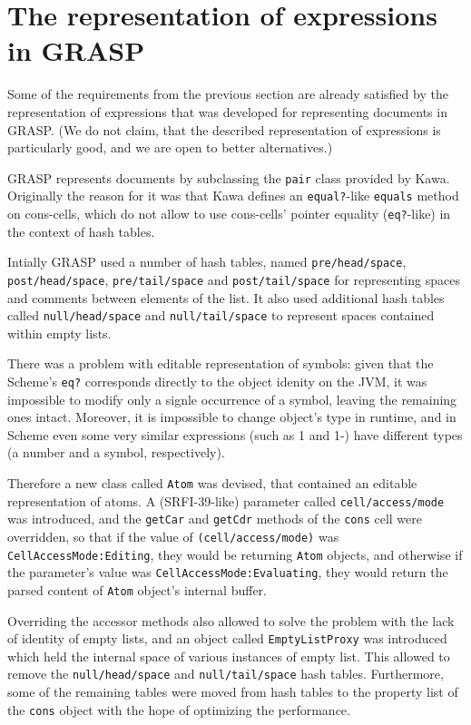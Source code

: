 \documentclass[acmsmall]{acmart}
\begin{document}
\section{The representation of expressions in GRASP}
\label{sec:orgcbb0d3f}

Some of the requirements from the previous section are already
satisfied by the representation of expressions that was developed for
representing documents in GRASP. (We do not claim, that the described
representation of expressions is particularly good, and we are open to
better alternatives.)

GRASP represents documents by subclassing the \texttt{pair} class
provided by Kawa. Originally the reason for it was that Kawa defines
an \texttt{equal?}-like \texttt{equals} method on cons-cells, which
do not allow to use cons-cells' pointer equality (\texttt{eq?}-like)
in the context of hash tables.

Intially GRASP used a number of hash tables, named
\texttt{pre\-/head\-/space}, \texttt{post\-/head\-/space},
\texttt{pre\-/tail\-/space} and \texttt{post\-/tail\-/space} for
representing spaces and comments between elements of the list.  It
also used additional hash tables called \texttt{null\-/head\-/space}
and \texttt{null\-/tail\-/space} to represent spaces contained
within empty lists.

There was a problem with editable representation of symbols:
given that the Scheme's \texttt{eq?} corresponds directly to the object
idenity on the JVM, it was impossible to modify only a signle occurrence
of a symbol, leaving the remaining ones intact. Moreover, it is
impossible to change object's type in runtime, and in Scheme even some
very similar expressions (such as 1 and 1-) have different types (a
number and a symbol, respectively).

Therefore a new class called \texttt{Atom} was devised, that contained
an editable representation of atoms. A (SRFI-39-like) parameter called
\texttt{cell\-/access\-/mode} was introduced, and the \texttt{getCar}
and \texttt{getCdr} methods of the \texttt{cons} cell were overridden,
so that if the value of \texttt{(cell\-/access\-/mode)} was
\texttt{Cell\-Access\-Mode\-:Editing}, they would be returning
\texttt{Atom} objects, and otherwise if the parameter's value was
\texttt{Cell\-Access\-Mode\-:Evaluating}, they would return the parsed
content of \texttt{Atom} object's internal buffer.

Overriding the accessor methods also allowed to solve the problem with
the lack of identity of empty lists, and an object called
\texttt{Empty\-List\-Proxy} was introduced which held the internal
space of various instances of empty list. This allowed to remove the
\texttt{null\-/head\-/space} and \texttt{null\-/tail\-/space} hash
tables. Furthermore, some of the remaining tables were moved from hash
tables to the property list of the \texttt{cons} object with the hope
of optimizing the performance.
\end{document}
